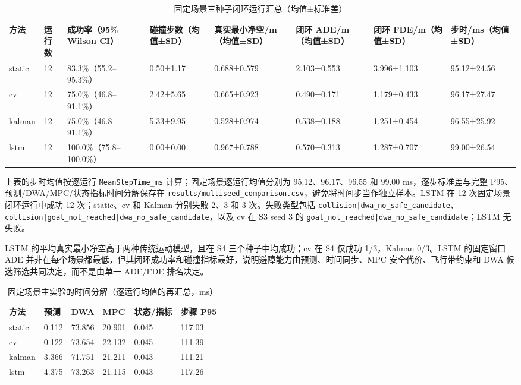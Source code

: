 \documentclass[10pt,a4paper,twocolumn]{ctexart}
\begin{document}
\begin{table}[t]
\centering
\small
\caption{固定场景三种子闭环运行汇总（均值±标准差）}
\label{tab:table-3}
\begin{tabularx}{\textwidth}{YYYYYYYY}
\toprule
方法 & 运行数 & 成功率（95\% Wilson CI） & 碰撞步数（均值±SD） & 真实最小净空/m（均值±SD） & 闭环 ADE/m（均值±SD） & 闭环 FDE/m（均值±SD） & 步时/ms（均值±SD） \\
\midrule
static & 12 & 83.3\%（55.2–95.3\%） & 0.50±1.17 & 0.688±0.579 & 2.103±0.553 & 3.996±1.103 & 95.12±24.56 \\
cv & 12 & 75.0\%（46.8–91.1\%） & 2.42±5.65 & 0.665±0.923 & 0.490±0.171 & 1.179±0.433 & 96.17±27.47 \\
kalman & 12 & 75.0\%（46.8–91.1\%） & 5.33±9.95 & 0.528±0.974 & 0.538±0.188 & 1.251±0.454 & 96.55±25.92 \\
lstm & 12 & 100.0\%（75.8–100.0\%） & 0.00±0.00 & 0.967±0.788 & 0.570±0.313 & 1.287±0.707 & 99.00±26.54 \\
\bottomrule
\end{tabularx}
\end{table}

上表的步时均值按逐运行 \texttt{MeanStepTime\_ms} 计算；固定场景逐运行均值分别为 95.12、96.17、96.55 和 99.00 ms，逐步标准差与完整 P95、预测/DWA/MPC/状态指标时间分解保存在 \texttt{results/multiseed\_comparison.csv}，避免将时间步当作独立样本。LSTM 在 12 次固定场景闭环运行中成功 12 次；static、cv 和 Kalman 分别失败 2、3 和 3 次。失败类型包括 \texttt{collision|dwa\_no\_safe\_candidate}、\texttt{collision|goal\_not\_reached|dwa\_no\_safe\_candidate}，以及 cv 在 S3 seed 3 的 \texttt{goal\_not\_reached|dwa\_no\_safe\_candidate}；LSTM 无失败。

LSTM 的平均真实最小净空高于两种传统运动模型，且在 S4 三个种子中均成功；cv 在 S4 仅成功 1/3，Kalman 0/3。LSTM 的固定窗口 ADE 并非在每个场景都最低，但其闭环成功率和碰撞指标最好，说明避障能力由预测、时间同步、MPC 安全代价、飞行带约束和 DWA 候选筛选共同决定，而不是由单一 ADE/FDE 排名决定。

\begin{table}[t]
\centering
\small
\caption{固定场景主实验的时间分解（逐运行均值的再汇总，ms）}
\label{tab:table-4}
\begin{tabularx}{\textwidth}{YYYYYY}
\toprule
方法 & 预测 & DWA & MPC & 状态/指标 & 步骤 P95 \\
\midrule
static & 0.112 & 73.856 & 20.901 & 0.045 & 117.03 \\
cv & 0.122 & 73.654 & 22.132 & 0.045 & 111.39 \\
kalman & 3.366 & 71.751 & 21.211 & 0.043 & 111.21 \\
lstm & 4.375 & 73.263 & 21.115 & 0.043 & 117.26 \\
\bottomrule
\end{tabularx}
\end{table}
\end{document}

